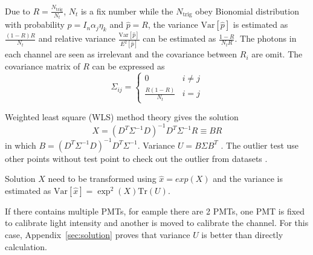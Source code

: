Due to $R=\frac{N_{\mathrm{trig}}}{N_t}$, $N_t$ is a fix number while the $N_{\mathrm{trig}}$ obey Bionomial distribution with probability $p=I_n\alpha_j\eta_k$ and $\hat{p}=R$, the variance $\mathrm{Var}[\hat{p}]$ is estimated as $\frac{(1-R)R}{N_t}$ and relative variance $\frac{\mathrm{Var}[\hat{p}]}{E^2[\hat{p}]}$ can be estimated as $\frac{1-R}{N_tR}$. The photons in each channel are seen as irrelevant and the covariance between $R_i$ are omit. The covariance matrix of $R$ can be expressed as
\begin{equation}
    \label{equ:variance}
    \Sigma_{ij}=\begin{cases}
        0 & i\neq j\\
        \frac{R(1-R)}{N_t} & i=j
    \end{cases}
\end{equation}

Weighted least square (WLS) method theory gives the solution
\begin{equation}
    \label{equ:solution}
    X=(D^T\Sigma^{-1}D)^{-1}D^T\Sigma^{-1}R\equiv BR
\end{equation}
in which $B=(D^T\Sigma^{-1}D)^{-1}D^T\Sigma^{-1}$. Variance $U=B\Sigma B^T$ \cite{Cowan1998StatisticalDA}\cite{AppliedRegression}. The outlier test use other points without test point to check out the outlier from datasets \cite{AppliedRegression}.

Solution $X$ need to be transformed using $\hat{x}=exp(X)$ and the variance is estimated as $\mathrm{Var}[\hat{x}]=\exp^2(X)\mathrm{Tr}(U)$.

If there contains multiple PMTs, for eample there are 2 PMTs, one PMT is fixed to calibrate light intensity and another is moved to calibrate the channel. For this case, Appendix~\ref{sec:solution} proves that variance $U$ is better than directly calculation.



